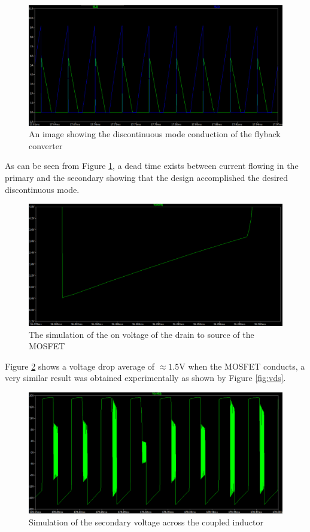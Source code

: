 \documentclass[a4paper, 12pt]{article}
\begin{document}
 \begin{figure}[H]
  \centering
  \includegraphics[width=\textwidth]{images/discont_sim.png}
  \caption{An image showing the discontinuous mode conduction of the flyback converter}
  \label{fig:discont_sim}
\end{figure} 

As can be seen from Figure \ref{fig:discont_sim}, a dead time exists between current flowing in the primary and the secondary showing that the design accomplished the desired discontinuous mode.  




  \begin{figure}[H]
  \centering
  \includegraphics[width=\textwidth]{images/vds_on_sim.png}
  \caption{The simulation of the on voltage of the drain to source of the MOSFET}
  \label{fig:vds_on_sim}
\end{figure} 
Figure \ref{fig:vds_on_sim} shows a voltage drop average of $\approx 1.5$V when the MOSFET conducts, a very similar result was obtained experimentally as shown by Figure \ref{fig:vds}.

\begin{figure}[H]
  \centering
  \includegraphics[width=\textwidth]{images/secondary_sim.png}
  \caption{Simulation of the secondary voltage across the coupled inductor}
  \label{fig:secondary_sim}
\end{figure} 
\end{document}

